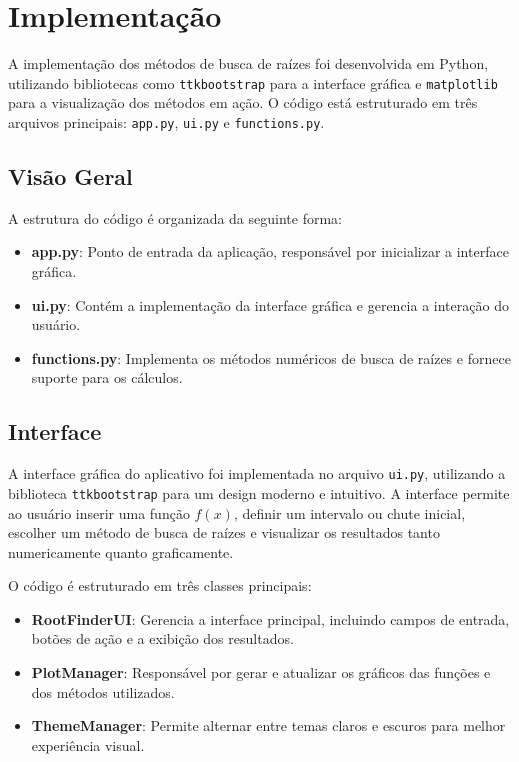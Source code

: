 \section{Implementação}

A implementação dos métodos de busca de raízes foi desenvolvida em Python,
utilizando bibliotecas como \texttt{ttkbootstrap} para a interface gráfica e
\texttt{matplotlib} para a visualização dos métodos em ação. O código está
estruturado em três arquivos principais: \texttt{app.py}, \texttt{ui.py} e
\texttt{functions.py}.

\subsection{Visão Geral}

A estrutura do código é organizada da seguinte forma:
\begin{itemize}
	\item \textbf{app.py}: Ponto de entrada da aplicação, responsável por inicializar a interface gráfica.
	\item \textbf{ui.py}: Contém a implementação da interface gráfica e gerencia a interação do usuário.
	\item \textbf{functions.py}: Implementa os métodos numéricos de busca de raízes e fornece suporte para os cálculos.
\end{itemize}

\subsection{Interface}

A interface gráfica do aplicativo foi implementada no arquivo \texttt{ui.py},
utilizando a biblioteca \texttt{ttkbootstrap} para um design moderno e
intuitivo. A interface permite ao usuário inserir uma função \( f(x) \), definir
um intervalo ou chute inicial, escolher um método de busca de raízes e
visualizar os resultados tanto numericamente quanto graficamente.

O código é estruturado em três classes principais:
\begin{itemize}
	\item \textbf{RootFinderUI}: Gerencia a interface principal, incluindo
	      campos de entrada, botões de ação e a exibição dos resultados.
	\item \textbf{PlotManager}: Responsável por gerar e atualizar os gráficos
	      das funções e dos métodos utilizados.
	\item \textbf{ThemeManager}: Permite alternar entre temas claros e escuros
	      para melhor experiência visual.
\end{itemize}

